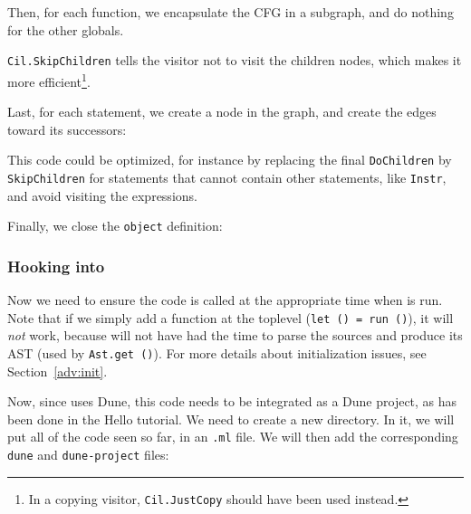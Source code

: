 Then, for each function, we encapsulate the CFG in a subgraph, and do
nothing for the other globals.


\texttt{Cil.SkipChildren} tells the visitor not to visit the children
nodes, which makes it more efficient\footnote{In a copying visitor,
\texttt{Cil.JustCopy}
should have been used instead.}.

Last, for each statement, we create a node in the graph, and create
the edges toward its successors:


This code could be optimized, for instance by replacing the final
\texttt{DoChildren} by \texttt{SkipChildren} for statements that
cannot contain other statements, like \texttt{Instr}, and avoid
visiting the expressions.

Finally, we close the \texttt{object} definition:

\subsubsection*{Hooking into \framac}

Now we need to ensure the code is called at the appropriate time when
\framac is run. Note that if we simply add a function at the toplevel
(\ie \verb|let () = run ()|), it will {\em not} work, because \framac
will not have had the time to parse the sources and produce its AST
(used by \verb|Ast.get ()|). For more details about initialization issues,
see Section~\ref{adv:init}.


Now, since \framac uses Dune, this code needs to be integrated as a Dune
project, as has been done in the Hello tutorial. We need to create a new
directory. In it, we will put all of the code seen so far, in an \texttt{.ml}
file. We will then add the corresponding \texttt{dune} and
\texttt{dune-project} files:


